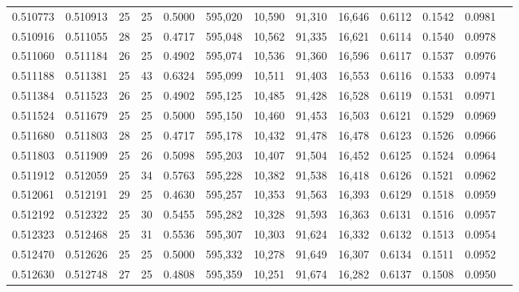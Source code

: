 \begin{tabular}{rrrrrrrrrrrrr}
0.510773 & 0.510913 &    25 &  25 &                                     0.5000 & 595,020 &  10,590 &  91,310 &  16,646 & 0.6112 & 0.1542 & 0.0981 \\
0.510916 & 0.511055 &    28 &  25 &                                     0.4717 & 595,048 &  10,562 &  91,335 &  16,621 & 0.6114 & 0.1540 & 0.0978 \\
0.511060 & 0.511184 &    26 &  25 &                                     0.4902 & 595,074 &  10,536 &  91,360 &  16,596 & 0.6117 & 0.1537 & 0.0976 \\
0.511188 & 0.511381 &    25 &  43 &                                     0.6324 & 595,099 &  10,511 &  91,403 &  16,553 & 0.6116 & 0.1533 & 0.0974 \\
0.511384 & 0.511523 &    26 &  25 &                                     0.4902 & 595,125 &  10,485 &  91,428 &  16,528 & 0.6119 & 0.1531 & 0.0971 \\
0.511524 & 0.511679 &    25 &  25 &                                     0.5000 & 595,150 &  10,460 &  91,453 &  16,503 & 0.6121 & 0.1529 & 0.0969 \\
0.511680 & 0.511803 &    28 &  25 &                                     0.4717 & 595,178 &  10,432 &  91,478 &  16,478 & 0.6123 & 0.1526 & 0.0966 \\
0.511803 & 0.511909 &    25 &  26 &                                     0.5098 & 595,203 &  10,407 &  91,504 &  16,452 & 0.6125 & 0.1524 & 0.0964 \\
0.511912 & 0.512059 &    25 &  34 &                                     0.5763 & 595,228 &  10,382 &  91,538 &  16,418 & 0.6126 & 0.1521 & 0.0962 \\
0.512061 & 0.512191 &    29 &  25 &                                     0.4630 & 595,257 &  10,353 &  91,563 &  16,393 & 0.6129 & 0.1518 & 0.0959 \\
0.512192 & 0.512322 &    25 &  30 &                                     0.5455 & 595,282 &  10,328 &  91,593 &  16,363 & 0.6131 & 0.1516 & 0.0957 \\
0.512323 & 0.512468 &    25 &  31 &                                     0.5536 & 595,307 &  10,303 &  91,624 &  16,332 & 0.6132 & 0.1513 & 0.0954 \\
0.512470 & 0.512626 &    25 &  25 &                                     0.5000 & 595,332 &  10,278 &  91,649 &  16,307 & 0.6134 & 0.1511 & 0.0952 \\
0.512630 & 0.512748 &    27 &  25 &                                     0.4808 & 595,359 &  10,251 &  91,674 &  16,282 & 0.6137 & 0.1508 & 0.0950 \\

\end{tabular}

